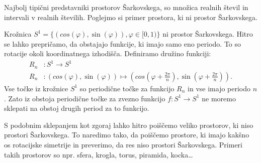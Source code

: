 \documentclass[mat2]{fmfdelo}
\begin{document}
Najbolj tipični predstavniki prostorov Šarkovskega, so množica realnih števil in intervali v realnih številih. Poglejmo si primer prostora, ki ni prostor Šarkovskega.

\begin{primer}
Krožnica $S^1 = \{ (cos(\varphi), \sin(\varphi)), \varphi \in [0, 1) \}$ ni prostor Šarkovskega. Hitro se lahko prepričamo, da obstajajo funkcije, ki imajo samo eno periodo. To so rotacije okoli koordinatnega izhodišča. Definiramo družino funkciji: 
\begin{equation*} %
\begin{split}
R_n &: S^1 \to S^1 \\ 
R_n &: (cos(\varphi), \sin(\varphi)) \mapsto (cos(\varphi + \frac{2 \pi}{n}), \sin(\varphi + \frac{2 \pi}{n})).
\end{split}
\end{equation*}
Vse točke iz krožnice $S^1$ so periodične točke za funkcijo $R_n$ in vse imajo periodo $n$. Zato iz obstoja periodične točke za zvezno funkcijo $f : S^1 \to S^1$ ne moremo sklepati na obstoj drugih period za to funkcijo.
\end{primer}
S podobnim sklepanjem kot zgoraj lahko hitro poiščemo veliko prostorov, ki niso prostori Šarkovskega. To naredimo tako, da poiščemo prostore, ki imajo kakšno os rotacijske simetrije in preverimo, da res niso prostori Šarkovskega. Primeri takih prostorov so npr. sfera, krogla, torus, piramida, kocka\dots 
\end{document}
